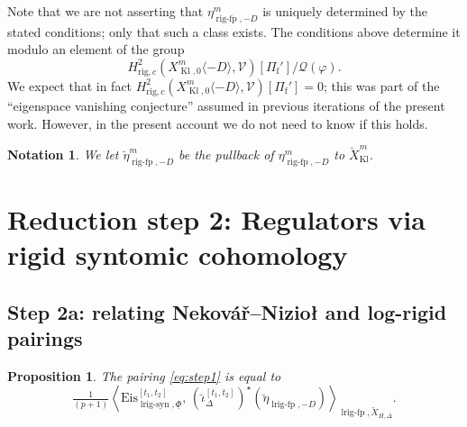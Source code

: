 \documentclass[cjm]{ipart}
\theoremstyle{plain}
\newtheorem{proposition}[theorem]{Proposition}
\newtheorem{notation}[theorem]{Notation}
\theoremstyle{remark}
\DeclareMathOperator{\Kl}{Kl}
\DeclareMathOperator{\lrigfp}{lrig-fp}
\DeclareMathOperator{\lrigsyn}{lrig-syn}
\DeclareMathOperator{\rigfp}{rig-fp}
\newcommand{\Eis}{\mathrm{Eis}}
\newcommand{\Nek}{Nekov\'a\v{r}\xspace}
\newcommand{\Niz}{Nizio\l\xspace}
\newcommand{\Pif}{\Pi_{\mathrm{f}}}
\newcommand{\cQ}{\mathcal{Q}}
\newcommand{\cV}{\mathcal{V}}
\newcommand{\rig}{\mathrm{rig}}
\numberwithin{equation}{subsection}
\begin{document}
  \begin{remark}
   Note that we are not asserting that $\eta_{\rigfp,-D}^{m}$ is uniquely determined by the stated conditions; only that such a class exists. The conditions above determine it modulo an element of the group
   \[ H^2_{\rig, c}\left(X_{\Kl,0}^m\langle -D\rangle, \cV\right)[\Pif'] / \cQ(\varphi).\]
   We expect that in fact $H^2_{\rig, c}(X_{\Kl,0}^m\langle -D\rangle, \cV)[\Pif'] = 0$; this was part of the ``eigenspace vanishing conjecture'' assumed in previous iterations of the present work. However, in the present account we do not need to know if this holds.
  \end{remark}

  \begin{notation}\label{not:breve-eta-rig}
   We let $\breve\eta_{\rigfp,-D}^m$ be the pullback of $\eta_{\rigfp,-D}^{m}$ to $\breve{X}_{\Kl}^m$.
  \end{notation}

\section{Reduction step 2: Regulators via rigid syntomic cohomology}
 \label{sect:redstep2}

 \subsection{Step 2a: relating \Nek--\Niz and log-rigid pairings}

  \begin{proposition}\label{prop:lrigreduction}
    The pairing \eqref{eq:step1}  is equal to
    \[ \tfrac{1}{(p+1)} \left\langle \Eis^{[t_1,t_2]}_{\lrigsyn,\underline\Phi},\, (\breve\iota_\Delta^{[t_1,t_2]})^\star(\breve\eta_{\lrigfp,-D})\right\rangle_{\lrigfp,\breve{X}_{H,\Delta}}.\]
  \end{proposition}
\end{document}
